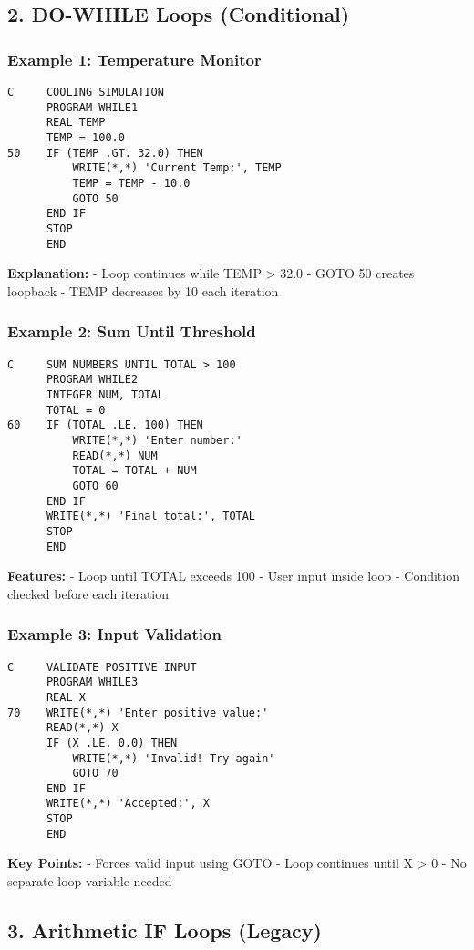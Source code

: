 \documentclass{book}
\begin{document}
\subsection*{2. DO-WHILE Loops (Conditional)}
\subsubsection*{Example 1: Temperature Monitor}
\begin{verbatim}
C     COOLING SIMULATION
      PROGRAM WHILE1
      REAL TEMP
      TEMP = 100.0
50    IF (TEMP .GT. 32.0) THEN
          WRITE(*,*) 'Current Temp:', TEMP
          TEMP = TEMP - 10.0
          GOTO 50
      END IF
      STOP
      END
\end{verbatim}
\textbf{Explanation:}
- Loop continues while TEMP > 32.0
- GOTO 50 creates loopback
- TEMP decreases by 10 each iteration

\subsubsection*{Example 2: Sum Until Threshold}
\begin{verbatim}
C     SUM NUMBERS UNTIL TOTAL > 100
      PROGRAM WHILE2
      INTEGER NUM, TOTAL
      TOTAL = 0
60    IF (TOTAL .LE. 100) THEN
          WRITE(*,*) 'Enter number:'
          READ(*,*) NUM
          TOTAL = TOTAL + NUM
          GOTO 60
      END IF
      WRITE(*,*) 'Final total:', TOTAL
      STOP
      END
\end{verbatim}
\textbf{Features:}
- Loop until TOTAL exceeds 100
- User input inside loop
- Condition checked before each iteration

\subsubsection*{Example 3: Input Validation}
\begin{verbatim}
C     VALIDATE POSITIVE INPUT
      PROGRAM WHILE3
      REAL X
70    WRITE(*,*) 'Enter positive value:'
      READ(*,*) X
      IF (X .LE. 0.0) THEN
          WRITE(*,*) 'Invalid! Try again'
          GOTO 70
      END IF
      WRITE(*,*) 'Accepted:', X
      STOP
      END
\end{verbatim}
\textbf{Key Points:}
- Forces valid input using GOTO
- Loop continues until X > 0
- No separate loop variable needed

\subsection*{3. Arithmetic IF Loops (Legacy)}
\end{document}

